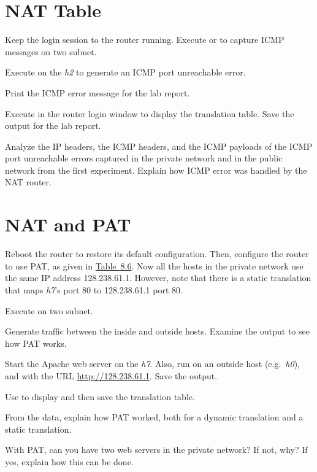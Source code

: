 \documentclass{../UTNetLab}
\begin{document}
\section{NAT Table}
    Keep the login session to the router running.
    Execute  or  to capture ICMP messages on two subnet.

    Execute  on the \textit{h2} to generate an ICMP port unreachable error.

    Print the ICMP error message for the lab report.

    Execute  in the router login window to display the translation table.
    Save the output for the lab report.

    \begin{report}
        \item Analyze the IP headers, the ICMP headers, and the ICMP payloads of the ICMP port unreachable errors captured in the private network and in the public network from the first experiment.
            Explain how ICMP error was handled by the NAT router.
    \end{report}

\section{NAT and PAT}
    Reboot the router to restore its default configuration.
    Then, configure the router to use PAT, as given in \hyperref[tab:8.6]{Table~8.6}.
    Now all the hosts in the private network use the same IP address 128.238.61.1.
    However, note that there is a static translation that maps \textit{h7}’s port 80 to 128.238.61.1 port 80.

    Execute  on two subnet.

    Generate traffic between the inside and outside hosts.
    Examine the  output to see how PAT works.

    Start the Apache web server on the \textit{h7}.
    Also, run  on an outside host (e.g.\ \textit{h0}), and with the URL \url{http://128.238.61.1}.
    Save the  output.

    Use  to display and then save the translation table.

    \begin{report}
        \item From the  data, explain how PAT worked, both for a dynamic translation and a static translation.

        \item With PAT, can you have two web servers in the private network?
    If not, why?
    If yes, explain how this can be done.
    \end{report}
\end{document}
